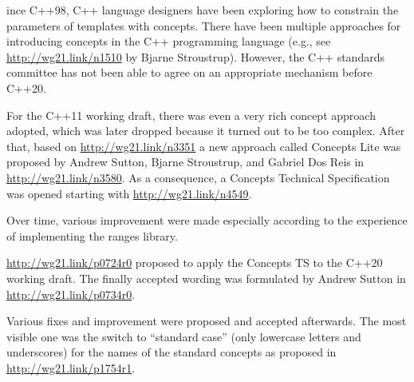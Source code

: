ince C++98, C++ language designers have been exploring how to constrain the parameters of templates with concepts. There have been multiple approaches for introducing concepts in the C++ programming language (e.g., see \url{http://wg21.link/n1510} by Bjarne Stroustrup). However, the C++ standards committee has not been able to agree on an appropriate mechanism before C++20.

For the C++11 working draft, there was even a very rich concept approach adopted, which was later dropped because it turned out to be too complex. After that, based on \url{http://wg21.link/n3351} a new approach called Concepts Lite was proposed by Andrew Sutton, Bjarne Stroustrup, and Gabriel Dos Reis in \url{http://wg21.link/n3580}. As a consequence, a Concepts Technical Specification was opened starting with \url{http://wg21.link/n4549}.

Over time, various improvement were made especially according to the experience of implementing the ranges library.

\url{http://wg21.link/p0724r0} proposed to apply the Concepts TS to the C++20 working draft. The finally accepted wording was formulated by Andrew Sutton in \url{http://wg21.link/p0734r0}.

Various fixes and improvement were proposed and accepted afterwards. The most visible one was the switch to “standard case” (only lowercase letters and underscores) for the names of the standard concepts as proposed in \url{http://wg21.link/p1754r1}.